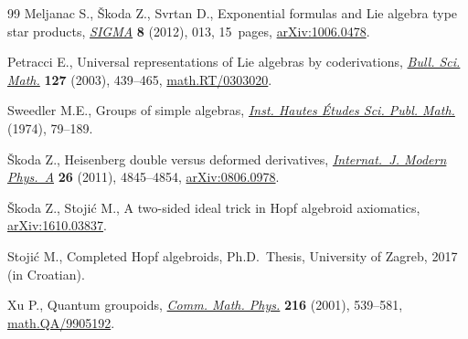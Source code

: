 \documentclass[pdftex]{sigma}
\numberwithin{equation}{section}
\begin{document}
\begin{thebibliography}{99}
Meljanac S., \v{S}koda Z., Svrtan D., Exponential formulas and {L}ie algebra
 type star products, \href{https://doi.org/10.3842/SIGMA.2012.013}{\textit{SIGMA}} \textbf{8} (2012), 013, 15~pages,
 \href{https://arxiv.org/abs/1006.0478}{arXiv:1006.0478}.

Petracci E., Universal representations of {L}ie algebras by coderivations,
 \href{https://doi.org/10.1016/S0007-4497(03)00041-1}{\textit{Bull. Sci. Math.}} \textbf{127} (2003), 439--465,
 \href{https://arxiv.org/abs/math.RT/0303020}{math.RT/0303020}.

Sweedler M.E., Groups of simple algebras, \href{https://doi.org/10.1007/BF02685882}{\textit{Inst. Hautes \'Etudes Sci.
 Publ. Math.}} (1974), 79--189.

\v{S}koda Z., Heisenberg double versus deformed derivatives,
 \href{https://doi.org/10.1142/S0217751X11054772}{\textit{Internat.~J. Modern Phys.~A}} \textbf{26} (2011), 4845--4854,
 \href{https://arxiv.org/abs/0806.0978}{arXiv:0806.0978}.

\v{S}koda Z., Stoji\'c M., A two-sided ideal trick in {H}opf algebroid
 axiomatics, \href{https://arxiv.org/abs/1610.03837}{arXiv:1610.03837}.

Stoji\'c M., Completed {H}opf algebroids, Ph.D.~Thesis, University of Zagreb, 2017 (in Croatian).

Xu P., Quantum groupoids, \href{https://doi.org/10.1007/s002200000334}{\textit{Comm. Math. Phys.}} \textbf{216} (2001),
 539--581, \href{https://arxiv.org/abs/math.QA/9905192}{math.QA/9905192}.

\end{thebibliography}\LastPageEnding
\end{document}
